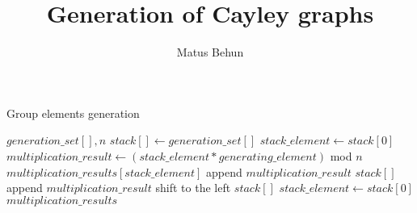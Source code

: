 \documentclass{article}
\begin{document}
\title{Generation of Cayley graphs}
\author{Matus Behun}

\maketitle
\begin{algorithm}
	\caption{Group elements generation}
	\label{alg1}	
	\begin{algorithmic}[1]
		\REQUIRE $generation\_set[], n$
		\STATE $stack[] \leftarrow generation\_set[]$
		\STATE $stack\_element \leftarrow stack[0]$
				\STATE $multiplication\_result \leftarrow (stack\_element * generating\_element)$ mod $n$
				\STATE $multiplication\_results[stack\_element]$ append $multiplication\_result$
				\STATE $stack[]$ append $multiplication\_result$
			\ENDFOR
			\STATE shift to the left $stack[]$
			\STATE $stack\_element \leftarrow stack[0]$
		\ENDWHILE
		\RETURN $multiplication\_results$
	\end{algorithmic}
\end{algorithm}
\end{document}
